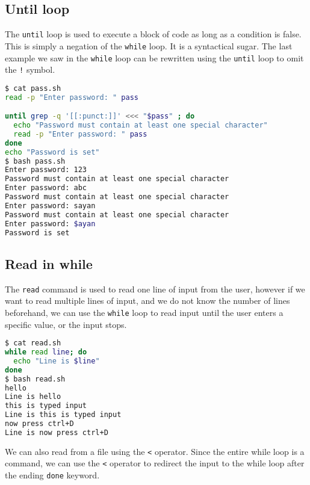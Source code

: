 \subsection{Until loop}

The \lstinline{until} loop is used to execute a block of code as long as a condition is false.
This is simply a negation of the \lstinline{while} loop.
It is a syntactical sugar.
The last example we saw in the \lstinline{while} loop can be rewritten using the \lstinline{until} loop to omit the \lstinline|!| symbol.

\begin{lstlisting}[language=bash]
$ cat pass.sh
read -p "Enter password: " pass

until grep -q '[[:punct:]]' <<< "$pass" ; do
  echo "Password must contain at least one special character"
  read -p "Enter password: " pass
done
echo "Password is set"
$ bash pass.sh
Enter password: 123
Password must contain at least one special character
Enter password: abc
Password must contain at least one special character
Enter password: sayan
Password must contain at least one special character
Enter password: $ayan
Password is set
\end{lstlisting}

\subsection{Read in while}

The \lstinline{read} command is used to read one line of input from the user,
however if we want to read multiple lines of input,
and we do not know the number of lines beforehand,
we can use the \lstinline{while} loop to read input until the user enters a specific value,
or the input stops.

\begin{lstlisting}[language=bash]
$ cat read.sh
while read line; do
  echo "Line is $line"
done
$ bash read.sh
hello
Line is hello
this is typed input
Line is this is typed input
now press ctrl+D
Line is now press ctrl+D
\end{lstlisting}

We can also read from a file using the \lstinline{<} operator.
Since the entire while loop is a command, we can use the \lstinline{<} operator to redirect the input to the while loop after the ending \lstinline|done| keyword.

